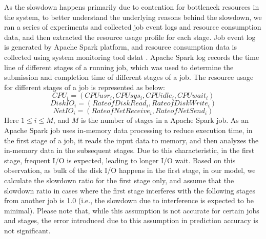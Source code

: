 \noindent
As the slowdown happens primarily due to contention for bottleneck resources in the system, to better understand the underlying reasons behind the slowdown, we ran a series of experiments and collected job event logs and resource consumption data, and then extracted the resource usage profile for each stage. Job event log is generated by Apache Spark platform, and resource consumption data is collected using system monitoring tool dstat \cite{dstat}. Apache Spark log records the time line of different stages of a running job, which was used to determine the submission and completion time of different stages of a job. The resource usage for different stages of a job is represented as below: 
\begin{equation}
\label{cpu}
CPU_i 
= (CPUusr_i, CPUsys_i, CPUidle_i, CPUwait_i) 
\end{equation}
\begin{equation}
\label{diskio}
DiskIO_i = (RateofDiskRead_i, RateofDiskWrite_i)
\end{equation}
\begin{equation}
\label{netio}
NetIO_i = (RateofNetReceive_i, RateofNetSend_i)
\end{equation}
Here $1 \leq i \leq M$, and $M$ is the number of stages in a Apache Spark job.
\noindent 
As an Apache Spark job uses in-memory data processing to reduce execution time, in the first stage of a job, it reads the input data to memory, and then analyzes the in-memory data in the subsequent stages. Due to this characteristic, in the first stage, frequent I/O is expected, leading to longer I/O wait. Based on this observation, as bulk of the disk I/O happens in the first stage, in our model, we calculate the slowdown ratio for the first stage only, and assume that the slowdown ratio in cases where the first stage interferes with the following stages from another job is 1.0 (i.e., the slowdown due to interference is expected to be minimal). Please note that, while this assumption is not accurate for certain jobs and stages, the error introduced due to this assumption in prediction accuracy is not significant. 


